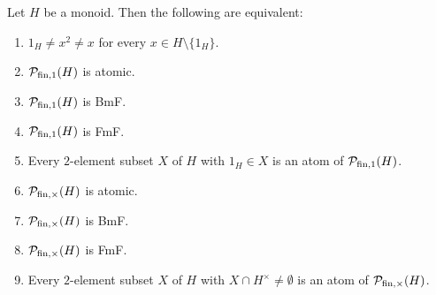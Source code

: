 \begin{thm}\label{BmF-char}
	Let $H$ be a monoid. Then the following are equivalent:
	\begin{enumerate}[label={\rm (\alph{*})}]
		\item\label{it:BmF-char(a)} $1_H \ne x^2 \ne x$ for every $x \in H \setminus \{1_H\}$.
		\item\label{it:BmF-char(b)} $\mathcal{P}_{\textrm{fin}, 1}(H)$ is atomic.
		\item\label{it:BmF-char(c)} $\mathcal{P}_{\textrm{fin}, 1}(H)$ is \textup{BmF}.
		\item\label{it:BmF-char(d)} $\mathcal{P}_{\textrm{fin}, 1}(H)$ is \textup{FmF}.
		\item\label{it:BmF-char(e)} Every $2$-element subset $X$ of $H$ with $1_H \in X$ is an atom of $\mathcal P_{\textrm{fin}, 1}(H)$.
		\item\label{it:BmF-char(f)} $\mathcal{P}_{\textrm{fin}, \times}(H)$ is atomic.
		\item\label{it:BmF-char(g)} $\mathcal{P}_{\textrm{fin}, \times}(H)$ is \textup{BmF}.
		\item\label{it:BmF-char(h)} $\mathcal{P}_{\textrm{fin}, \times}(H)$ is \textup{FmF}.
		\item\label{it:BmF-char(i)} Every $2$-element subset $X$ of $H$ with $X \cap H^\times \ne \emptyset$ is an atom of $\mathcal P_{\textrm{fin}, \times}(H)$.
	\end{enumerate}
\end{thm}
%
